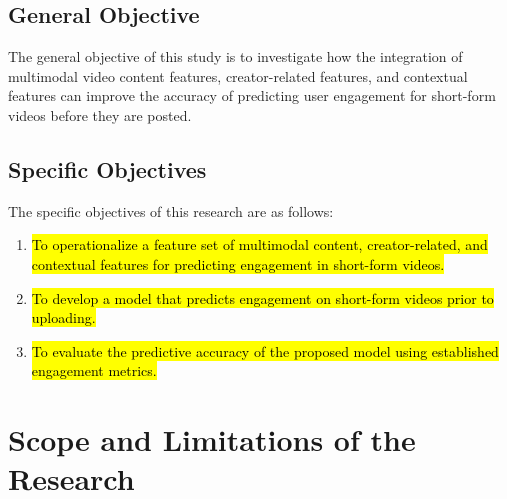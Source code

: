 \subsection*{General Objective}
The general objective of this study is to investigate how the integration of multimodal video content features, creator-related features, and contextual features can improve the accuracy of predicting user engagement for short-form videos before they are posted.


\subsection*{Specific Objectives}
The specific objectives of this research are as follows:
\begin{enumerate}
    \item \hl{To operationalize a feature set of multimodal content, creator-related, and contextual features for predicting engagement in short-form videos.} 
    \item \hl{To develop a model that predicts engagement on short-form videos prior to uploading.}
    \item \hl{To evaluate the predictive accuracy of the proposed model using established engagement metrics.}
\end{enumerate}


\section{Scope and Limitations of the Research}
\label{sec:scopelimitations}

